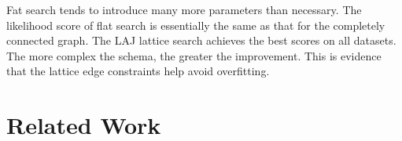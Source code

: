 \documentclass{vldb}
\begin{document}
\begin{table}[!h]
\begin{center}
\end{center}
\caption{Statistical Performance of different Searching Algorithms by dataset.}
\label{table:result_scores}
\end{table}

Fat search tends to introduce many more parameters than necessary. The likelihood score of flat search is essentially the same as that for the completely connected graph. The LAJ lattice search achieves the best scores on all datasets. The  more complex the schema, the greater the improvement. This is evidence that the lattice edge constraints help avoid overfitting.

%
%
%



\section{Related Work} 
\end{document}
